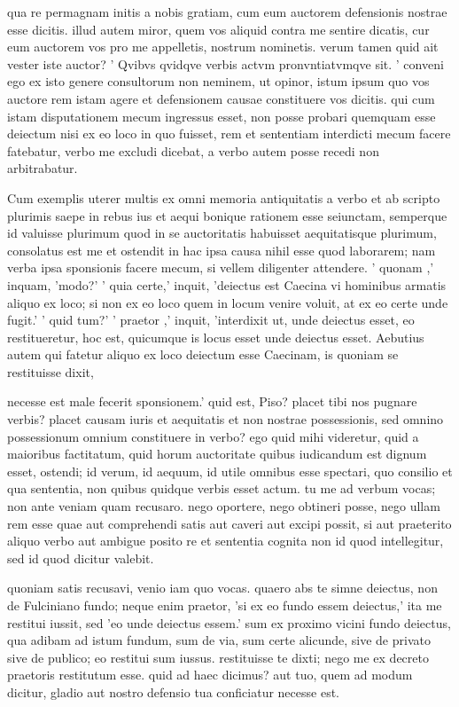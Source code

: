  qua re permagnam initis a nobis gratiam, cum eum auctorem defensionis nostrae esse dicitis. illud autem miror, quem vos aliquid contra me sentire dicatis, cur eum auctorem vos pro me appelletis, nostrum nominetis. verum tamen quid ait vester iste auctor? ' Qvibvs qvidqve verbis actvm pronvntiatvmqve sit. ' conveni ego ex isto genere consultorum non neminem, ut opinor, istum ipsum quo vos auctore rem istam agere et defensionem causae constituere vos dicitis. qui cum istam disputationem mecum ingressus esset, non posse probari quemquam esse deiectum nisi ex eo loco in quo fuisset, rem et sententiam interdicti mecum facere fatebatur, verbo me excludi dicebat, a verbo autem posse recedi non arbitrabatur.

 Cum exemplis uterer multis ex omni memoria antiquitatis a verbo et ab scripto plurimis saepe in rebus ius et aequi bonique rationem esse seiunctam, semperque id valuisse plurimum quod in se auctoritatis habuisset aequitatisque plurimum, consolatus est me et ostendit in hac ipsa causa nihil esse quod laborarem; nam verba ipsa sponsionis facere mecum, si vellem diligenter attendere. ' quonam ,' inquam, 'modo?' ' quia certe,' inquit, 'deiectus est Caecina vi hominibus armatis aliquo ex loco; si non ex eo loco quem in locum venire voluit, at ex eo certe unde fugit.' ' quid tum?' ' praetor ,' inquit, 'interdixit ut, unde deiectus esset, eo restitueretur, hoc est, quicumque is locus esset unde deiectus esset. Aebutius autem qui fatetur aliquo ex loco deiectum esse Caecinam, is quoniam se restituisse dixit,

 necesse est male fecerit sponsionem.' quid est, Piso? placet tibi nos pugnare verbis? placet causam iuris et aequitatis et non nostrae possessionis, sed omnino possessionum omnium constituere in verbo? ego quid mihi videretur, quid a maioribus factitatum, quid horum auctoritate quibus iudicandum est dignum esset, ostendi; id verum, id aequum, id utile omnibus esse spectari, quo consilio et qua sententia, non quibus quidque verbis esset actum. tu me ad verbum vocas; non ante veniam quam recusaro. nego oportere, nego obtineri posse, nego ullam rem esse quae aut comprehendi satis aut caveri aut excipi possit, si aut praeterito aliquo verbo aut ambigue posito re et sententia cognita non id quod intellegitur, sed id quod dicitur valebit.

 quoniam satis recusavi, venio iam quo vocas. quaero abs te simne deiectus, non de Fulciniano fundo; neque enim praetor, 'si ex eo fundo essem deiectus,' ita me restitui iussit, sed 'eo unde deiectus essem.' sum ex proximo vicini fundo deiectus, qua adibam ad istum fundum, sum de via, sum certe alicunde, sive de privato sive de publico; eo restitui sum iussus. restituisse te dixti; nego me ex decreto praetoris restitutum esse. quid ad haec dicimus? aut tuo, quem ad modum dicitur, gladio aut nostro defensio tua conficiatur necesse est.

